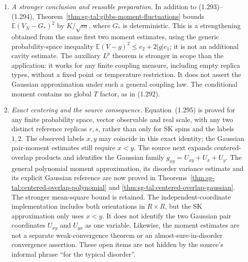 \begin{remark}
\begin{enumerate}
and hence the same Gibbs measure and magnetizations. Only the replicas are sampled
independently conditional on that disorder. Pair exponents on cross-block pairs
are zero. This is the source's replica argument for (1.293), expressed by a generic
product-integral identity; neither independent disorder copies nor doubling powers
on the original labels would compute the required conditional square.
\item \emph{A stronger conclusion and reusable preparation.}
In addition to (1.293)--(1.294),
Theorem~\ref{thm:sg-tal:gibbs-moment-fluctuations} bounds
$\mathbb E(V_N-G_*)^2$ by $K/\sqrt m$, where $G_*$ is deterministic.
This is a strengthening obtained from the same first two moment estimates,
using the generic probability-space inequality
$\mathbb E(V-g)^2\le e_2+2|g|e_1$; it is not an additional cavity estimate.
The auxiliary $L^p$ theorem is stronger in scope than the application: it works for
any finite coupling measure, including empty replica types, without a fixed point
or temperature restriction. It does not assert the Gaussian approximation under
such a general coupling law. The conditional moment contains no global $T$ factor,
as in (1.292).
\item \emph{Exact centering and the source consequence.}
Equation~(1.295) is proved for any finite probability space, vector observable and
real scale, with any two distinct reference replicas $r,s$, rather than only for
SK spins and the labels $1,2$. The observed labels $x,y$ may coincide in this exact
identity; the Gaussian pair-moment estimates still require $x<y$.
The source next expands centered-overlap products and identifies the Gaussian family
$g_{xy}=U_{xy}+U_x+U_y$. The general polynomial moment approximation, its disorder
variance estimate and its explicit Gaussian reference are now proved in
Theorems~\ref{thm:sg-tal:centered-overlap-polynomial} and
\ref{thm:sg-tal:centered-overlap-gaussian}. The stronger mean-square bound is retained.
The independent-coordinate implementation includes both orientations in $R\times R$,
but the SK approximation only uses $x<y$. It does not identify the two Gaussian
pair coordinates $U_{xy}$ and $U_{yx}$ as one variable.
Likewise, the moment estimates are not a separate weak-convergence theorem or an
almost-sure-in-disorder convergence assertion. These open items are not hidden by
the source's informal phrase ``for the typical disorder''.
\end{enumerate}
\end{remark}


